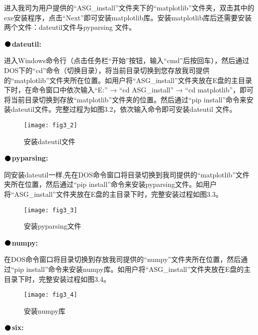 进入我司为用户提供的“ASG\_install”文件夹下的“matplotlib”文件夹，双击其中的exe安装程序，点击“Next”即可安装matplotlib库。安装matplotlib库后还需要安装两个文件：dateutil文件与pyparsing 文件。
\vspace{0.4cm}

\noindent$\vcenter{\hbox{\huge$\bullet$}}$\quad\fontsize{12pt}{\baselineskip}\textbf{dateutil:}

进入Windows命令行（点击任务栏“开始”按钮，输入“cmd”后按回车），然后通过DOS下的“cd”命令（切换目录），将当前目录切换到您存放我司提供的“matplotlib”文件夹所在位置。如用户将“ASG\_install”文件夹放在E盘的主目录下时，在命令窗口中依次输入“E:” → “cd ASG\_install” → “cd matplotlib”，即可将当前目录切换到存放“matplotlib”文件夹的位置。然后通过“pip install”命令来安装dateutil文件。完整过程为如图3.2，依次输入命令即可安装dateutil 文件。
\begin{figure}[ht]
\centering
\texttt{[image: fig3\_2]}
\caption{安装dateutil文件}
\end{figure}

\newpage
\noindent$\vcenter{\hbox{\huge$\bullet$}}$\quad\fontsize{12pt}{\baselineskip}\textbf{pyparsing:}

同安装dateutil一样,先在DOS命令窗口将目录切换到我司提供的“matplotlib”文件夹所在位置，然后通过“pip install”命令来安装pyparsing文件。如用户将“ASG\_install”文件夹放在E盘的主目录下时，完整安装过程如图3.3。


\begin{figure}[H]
\centering
\texttt{[image: fig3\_3]}
\caption{安装pyparsing文件}
\end{figure}

\noindent$\vcenter{\hbox{\huge$\bullet$}}$\quad\fontsize{12pt}{\baselineskip}\textbf{numpy:}

在DOS命令窗口将目录切换到存放我司提供的“numpy”文件夹所在位置，然后通过“pip install”命令来安装numpy库。如用户将“ASG\_install”文件夹放在E盘的主目录下时，完整安装过程如图3.4。
\begin{figure}[H]
\centering
\texttt{[image: fig3\_4]}
\caption{安装numpy库}
\end{figure}

\noindent$\vcenter{\hbox{\huge$\bullet$}}$\quad\fontsize{12pt}{\baselineskip}\textbf{six:}

